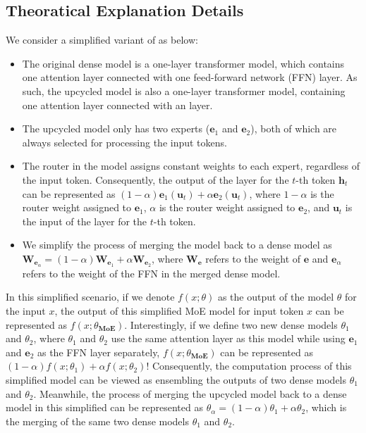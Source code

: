 \subsection{Theoratical Explanation Details}\label{sec:theoratical_analysis}
We consider a simplified variant of \ours as below:
\begin{itemize}[leftmargin=1em]
\setlength{\parskip}{2pt}
\setlength\itemsep{0pt}
\item The original dense model is a one-layer transformer model, which contains one attention layer connected with one feed-forward network (FFN) layer. As such, the upcycled \moe model is also a one-layer transformer model, containing one attention layer connected with an \moe layer.
\item The upcycled \moe model only has two experts ($\textbf{e}_1$ and $\textbf{e}_2$), both of which are always selected for processing the input tokens.
\item The router in the \moe model assigns constant weights to each expert, regardless of the input token. Consequently, the output of the \moe layer for the $t$-th token $\textbf{h}_t$ can be represented as $(1-\alpha) \textbf{e}_1(\textbf{u}_t) + \alpha \textbf{e}_2(\textbf{u}_t)$, where $1-\alpha$ is the router weight assigned to $\textbf{e}_1$, $\alpha$ is the router weight assigned to $\textbf{e}_2$, and $\textbf{u}_t$ is the input of the \moe layer for the $t$-th token.
\item We simplify the process of merging the \moe model back to a dense model as $\textbf{W}_{\textbf{e}_{\alpha}} = (1-\alpha) \textbf{W}_{\textbf{e}_1} + \alpha \textbf{W}_{\textbf{e}_2}$, where $\textbf{W}_\textbf{e}$ refers to the weight of $\textbf{e}$ and $\textbf{e}_{\alpha}$ refers to the weight of the FFN in the merged dense model.
\end{itemize}

In this simplified scenario, if we denote $f(x;\theta)$ as the output of the model $\theta$ for the input $x$, the output of this simplified MoE model for input token $x$ can be represented as $f(x;\theta_{\textbf{MoE}})$. Interestingly, if we define two new dense models $\theta_1$ and $\theta_2$, where $\theta_1$ and $\theta_2$ use the same attention layer as this \moe model while using $\textbf{e}_1$ and $\textbf{e}_2$ as the FFN layer separately, $f(x;\theta_{\textbf{MoE}})$ can be represented as $(1-\alpha) f(x;\theta_1) + \alpha f(x;\theta_2)$! Consequently, the computation process of this simplified \moe model can be viewed as ensembling the outputs of two dense models $\theta_1$ and $\theta_2$. Meanwhile, the process of merging the upcycled \moe model back to a dense model in this simplified \ours can be represented as $\theta_{\alpha} = (1-\alpha) \theta_1 + \alpha \theta_2$, which is the merging of the same two dense models $\theta_1$ and $\theta_2$.
